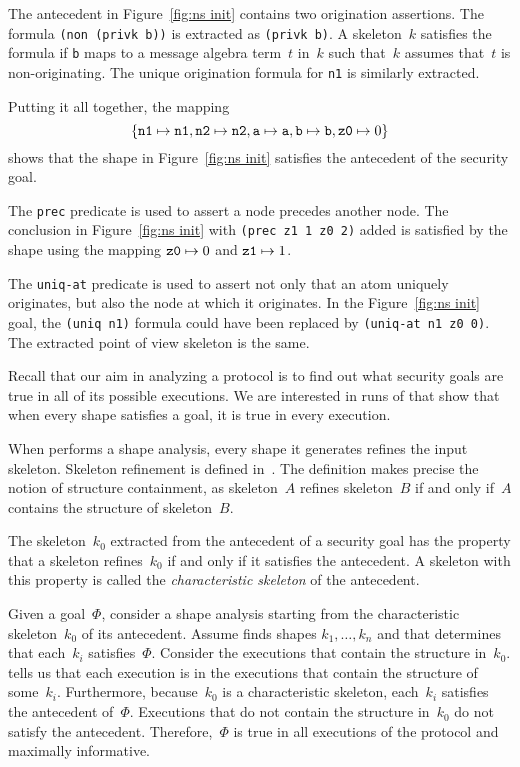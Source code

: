 \documentclass[12pt]{article}
\begin{document}
The antecedent in Figure~\ref{fig:ns init} contains two origination
assertions.  The formula \texttt{(non (privk b))} is extracted as
\texttt{(privk b)}.  A skeleton~$k$ satisfies the formula if
\texttt{b} maps to a message algebra term~$t$ in~$k$ such that~$k$
assumes that~$t$ is non-originating.  The unique origination formula for
\texttt{n1} is similarly extracted.

Putting it all together, the mapping
\[\{\mathtt{n1}\mapsto\mathtt{n1},
\mathtt{n2}\mapsto\mathtt{n2}, \mathtt{a}\mapsto\mathtt{a},
\mathtt{b}\mapsto\mathtt{b},\mbox{\tt z0}\mapsto0\}\] shows that
the shape in Figure~\ref{fig:ns init} satisfies the antecedent of the
security goal.

The \texttt{prec} predicate is used to assert a node precedes another
node.  The conclusion in Figure~\ref{fig:ns init} with \texttt{(prec
  z1 1 z0 2)} added is satisfied by the shape using the mapping
$\mbox{\tt z0}\mapsto0$ and $\mbox{\tt z1}\mapsto1$.

The \texttt{uniq-at} predicate is used to assert not only that an atom
uniquely originates, but also the node at which it originates.  In the
Figure~\ref{fig:ns init} goal, the \texttt{(uniq n1)} formula could
have been replaced by \texttt{(uniq-at n1 z0 0)}.  The extracted point
of view skeleton is the same.

Recall that our aim in analyzing a protocol is to find out what
security goals are true in all of its possible executions.  We are
interested in runs of {\cpsa} that show that when every shape
satisfies a goal, it is true in every execution.

When {\cpsa} performs a shape analysis, every shape it generates
refines the input skeleton.  Skeleton refinement is defined
in~\cite[Section~6]{cpsaprimer09}.  The definition makes precise the
notion of structure containment, as skeleton~$A$ refines skeleton~$B$
if and only if~$A$ contains the structure of skeleton~$B$.

The skeleton~$k_0$ extracted from the antecedent of a security goal
has the property that a skeleton refines~$k_0$ if and only if it
satisfies the antecedent.  A skeleton with this property is called the
\emph{characteristic skeleton} of the antecedent.

Given a goal~\(\Phi\), consider a shape analysis starting from the
characteristic skeleton~$k_0$ of its antecedent.  Assume {\cpsa} finds
shapes $k_1,\ldots,k_n$ and that {\cpsa} determines that each~$k_i$
satisfies~$\Phi$.  Consider the executions that contain the structure
in~$k_0$.  {\cpsa} tells us that each execution is in the executions
that contain the structure of some~$k_i$.  Furthermore, because~$k_0$
is a characteristic skeleton, each~$k_i$ satisfies the antecedent
of~$\Phi$.  Executions that do not contain the structure in~$k_0$ do
not satisfy the antecedent.  Therefore,~$\Phi$ is true in all
executions of the protocol and maximally informative.
\end{document}
